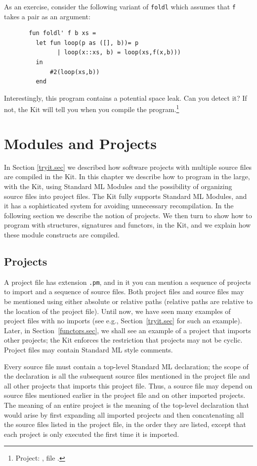 \documentclass[12pt]{book}
\begin{document}
As an exercise, consider the following variant of {\tt foldl} which assumes that
{\tt f} takes a pair as an argument:
\begin{verbatim}
       fun foldl' f b xs = 
         let fun loop(p as ([], b))= p
               | loop(x::xs, b) = loop(xs,f(x,b)))
         in
             #2(loop(xs,b))
         end
\end{verbatim}
Interestingly, this program contains a potential space leak. Can you
detect it? If not, the Kit will tell you when you compile the program.\footnote{Project:
, file .}


\chapter{Modules and Projects}
\label{modules_and_projects.chap}
In Section \ref{tryit.sec} we described how software projects with
multiple source files are compiled in the Kit. In this chapter we
describe how to program in the large, with the Kit, using Standard ML
Modules and the possibility of organizing source files into project
files. The Kit fully supports Standard ML Modules, and it has a
sophisticated system for avoiding unnecessary recompilation. In the
following section we describe the notion of projects. We then turn to
show how to program with structures, signatures and functors, in the
Kit, and we explain how these module constructs are compiled.


\section{Projects \label{projects.sec}}
A project file has extension {\tt .pm}, and in it you can mention a
sequence of projects to import and a sequence of source files. Both
project files and source files may be mentioned using either absolute
or relative paths (relative paths are relative to the location of the
project file). Until now, we have seen many examples of project files
with no imports (see e.g., Section~\ref{tryit.sec} for such an
example). Later, in Section~\ref{functors.sec}, we shall see an
example of a project that imports other projects; the Kit enforces the
restriction that projects may not be cyclic. Project files may contain
Standard ML style comments.

Every source file must contain a top-level Standard ML declaration;
the scope of the declaration is all the subsequent source files
mentioned in the project file and all other projects that imports
this project file. Thus, a source file may depend on source files
mentioned earlier in the project file and on other imported projects.
The meaning of an entire project is the meaning of the top-level
declaration that would arise by first expanding all imported projects
and then concatenating all the source files listed in the project
file, in the order they are listed, except that each project is 
only executed the first time it is imported. 
\end{document}

